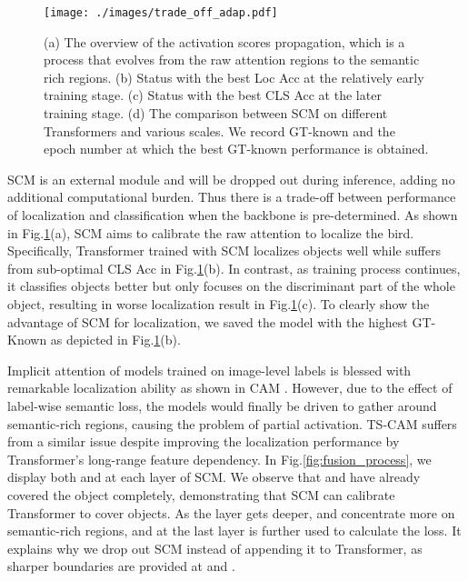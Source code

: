 \documentclass[runningheads]{llncs}
\begin{document}
\begin{figure}[t]
    \centering
    \texttt{[image: ./images/trade\_off\_adap.pdf]}
    \caption{(a) The overview of the activation scores propagation, which is a process that evolves from the raw attention regions to the semantic rich regions. (b) Status with the best Loc Acc at the relatively early training stage. (c) Status with the best CLS Acc at the later training stage. (d) The comparison between SCM on different Transformers and various scales. We record GT-known and the epoch number at which the best GT-known performance is obtained.}
    \label{fig:trade-off}
\end{figure}


\label{sec:trade-off}
SCM is an external module and will be dropped out during inference, adding no additional computational burden. 
Thus there is a trade-off between performance of localization and classification when the backbone is pre-determined.
As shown in Fig.\ref{fig:trade-off}(a), SCM aims to calibrate the raw attention to localize the bird. 
Specifically, Transformer trained with SCM localizes objects well while suffers from sub-optimal CLS Acc in Fig.\ref{fig:trade-off}(b). 
In contrast, as training process continues, it classifies objects better but only focuses on the discriminant part of the whole object, resulting in worse localization result in Fig.\ref{fig:trade-off}(c).
To clearly show the advantage of SCM for localization, we saved the model with the highest GT-Known as depicted in Fig.\ref{fig:trade-off}(b). 


Implicit attention of models trained on image-level labels is blessed with remarkable localization ability as shown in CAM \cite{zhou2015cnnlocalization}. However, due to the effect of label-wise semantic loss, the models would finally be driven to gather around semantic-rich regions, causing the problem of partial activation. TS-CAM \cite{gao2021tscam} suffers from a similar issue despite improving the localization performance by Transformer's long-range feature dependency.
In Fig.\ref{fig:fusion_process}, we display both  and  at each layer of SCM. 
We observe that  and  have already covered the object completely, demonstrating that SCM can calibrate Transformer to cover objects. 
As the layer gets deeper,  and  concentrate more on semantic-rich regions, and
 at the last layer is further used to calculate the loss.
It explains why we drop out SCM instead of appending it to Transformer, as sharper boundaries are provided at  and  .
\end{document}
